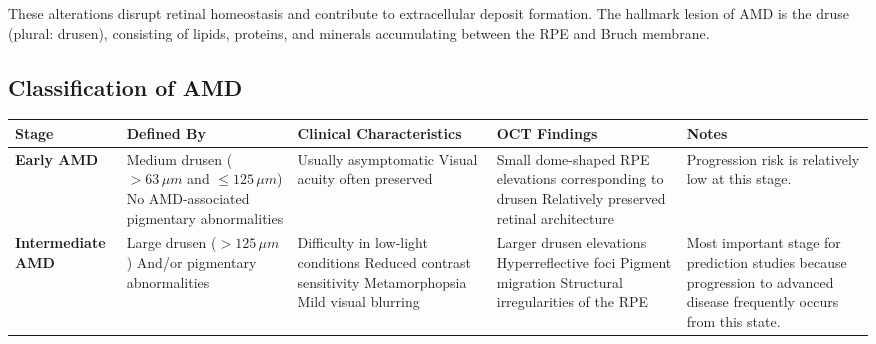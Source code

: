 \documentclass[11pt]{article}
\begin{document}
These alterations disrupt retinal homeostasis and contribute to extracellular deposit formation. The hallmark lesion of AMD is the druse (plural: drusen), consisting of lipids, proteins, and minerals accumulating between the RPE and Bruch membrane.  

\subsection*{Classification of AMD}

\begin{table}[H]
\centering
\footnotesize
\renewcommand{\arraystretch}{1.35}

\begin{tabularx}{\textwidth}{>{\raggedright\arraybackslash}p{2.4cm}
>{\raggedright\arraybackslash}p{3.0cm}
>{\raggedright\arraybackslash}p{3.0cm}
>{\raggedright\arraybackslash}p{3.2cm}
>{\raggedright\arraybackslash}X}
\toprule
\textbf{Stage} & \textbf{Defined By} & \textbf{Clinical Characteristics} & \textbf{OCT Findings} & \textbf{Notes} \\
\midrule

\textbf{Early AMD}
&
Medium drusen ($>63\,\mu m$ and $\leq 125\,\mu m$)\newline
No AMD-associated pigmentary abnormalities
&
Usually asymptomatic\newline
Visual acuity often preserved
&
Small dome-shaped RPE elevations corresponding to drusen\newline
Relatively preserved retinal architecture
&
Progression risk is relatively low at this stage.
\\
\midrule

\textbf{Intermediate AMD}
&
Large drusen ($>125\,\mu m$)\newline
And/or pigmentary abnormalities
&
Difficulty in low-light conditions\newline
Reduced contrast sensitivity\newline
Metamorphopsia\newline
Mild visual blurring
&
Larger drusen elevations\newline
Hyperreflective foci\newline
Pigment migration\newline
Structural irregularities of the RPE
&
Most important stage for prediction studies because progression to advanced disease frequently occurs from this state.
\\
\midrule


\end{tabularx}
\end{table}
\end{document}
